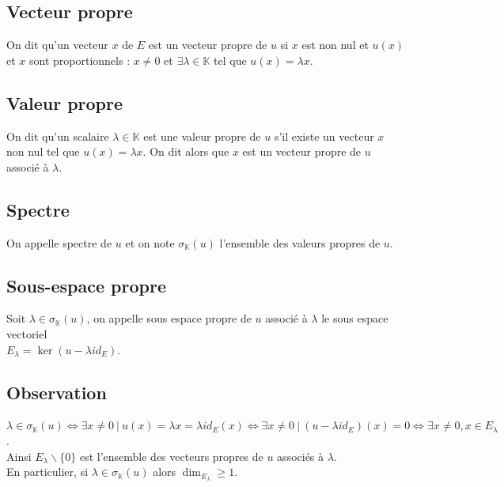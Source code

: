 \documentclass[a4paper,10pt]{book} %
\newcommand{\K}{\mathbb{K}}
\newcommand{\tq}{~|~}
\begin{document}
\subsection{Vecteur propre}
On dit qu'un vecteur $x$ de $E$ est un vecteur propre de $u$ si $x$ est non nul et $u(x)$ et $x$ sont proportionnels : $x\neq 0$ et $\exists\lambda\in \K$ tel que $u(x)=\lambda x$.

\subsection{Valeur propre}
On dit qu'un scalaire $\lambda\in \K$ est une valeur propre de $u$ s'il existe un vecteur $x$ non nul tel que $u(x)=\lambda x$. On dit alors que $x$ est un vecteur propre de $u$ associé à $\lambda$.

\subsection{Spectre}
On appelle spectre de $u$ et on note $\sigma_{\K}(u)$ l'ensemble des valeurs propres de $u$.

\subsection{Sous-espace propre}
Soit $\lambda\in \sigma_{\K}(u)$, on appelle sous espace propre de $u$ associé à $\lambda$ le sous espace vectoriel\\$E_\lambda=\ker(u-\lambda id_E)$.

\subsection{Observation}
$\lambda\in \sigma_{\K}(u)\Leftrightarrow \exists x\neq 0 \tq u(x)=\lambda x=\lambda id_E(x) \Leftrightarrow \exists x\neq 0 \tq (u-\lambda id_E)(x)=0 \Leftrightarrow \exists x\neq 0, x\in E_\lambda$.\\

Ainsi $E_\lambda\backslash\{0\}$ est l'ensemble des vecteurs propres de $u$ associés à $\lambda$.\\

En particulier, si $\lambda\in \sigma_{\K}(u)$ alors $\dim_{E_{\lambda}}\geq 1$.
\end{document}
